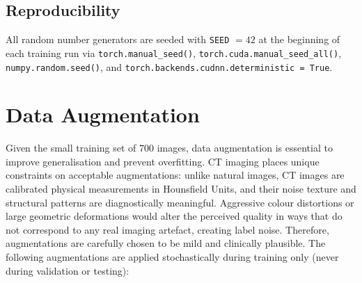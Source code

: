 \subsection{Reproducibility}

All random number generators are seeded with \texttt{SEED} $= 42$ at the beginning of
each training run via \texttt{torch.manual\_seed()},
\texttt{torch.cuda.manual\_seed\_all()}, \texttt{numpy.random.seed()}, and
\texttt{torch.backends.cudnn.deterministic = True}.


\section{Data Augmentation}
\label{sec:augmentation}

Given the small training set of 700 images, data augmentation is essential to improve
generalisation and prevent overfitting. CT imaging places unique constraints on
acceptable augmentations: unlike natural images, CT images are calibrated physical
measurements in Hounsfield Units, and their noise texture and structural patterns are
diagnostically meaningful. Aggressive colour distortions or large geometric deformations
would alter the perceived quality in ways that do not correspond to any real imaging
artefact, creating label noise. Therefore, augmentations are carefully chosen to be mild
and clinically plausible. The following augmentations are applied stochastically during
training only (never during validation or testing):

